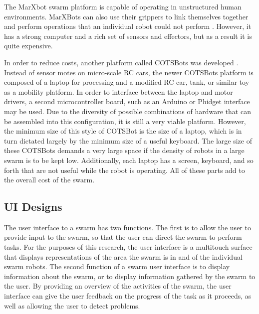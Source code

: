 \documentclass[]{article}
\begin{document}
The MarXbot swarm platform  is capable of operating in unstructured human environments. MarXBots can also use their grippers to link themselves together and perform operations  that an individual robot could not perform \cite{bonani2010marxbot}. However, it has a strong computer and a rich set of sensors and effectors, but as a result it is quite expensive. 

In order to reduce costs, another platform called COTSBots was developed \cite{soule2011cotsbots}.  
Instead of sensor motes on micro-scale RC cars, the newer COTSBots platform is composed of a laptop for processing and a modified RC car, tank, or similar toy as a mobility platform.
In order to interface between the laptop and motor drivers, a second microcontroller board, such as an Arduino or Phidget interface may be used. 
Due to the diversity of possible combinations of hardware that can be assembled into this configuration, it is still a very viable platform. 
However, the minimum size of this style of COTSBot is the size of a laptop, which is in turn dictated largely by the minimum size of a useful keyboard. 
The large size of these COTSBots demands a very large space if the density of robots in a large swarm is to be kept low. 
Additionally, each laptop has a screen, keyboard, and so forth that are not useful while the robot is operating. 
All of these parts add to the overall cost of the swarm. 


\subsection{UI Designs}

The user interface to a swarm has two functions. 
The first is to allow the user to provide input to the swarm, so that the user can direct the swarm to perform tasks. 
For the purposes of this research, the user interface is a multitouch surface  that displays representations of the area the swarm is in and of the individual swarm robots. 
The second function of a swarm user interface is to display information about the swarm, or to display information gathered by the swarm to the user. 
By providing an overview of the activities of the swarm, the user interface can give the user feedback on the progress of the task as it proceeds, as well as allowing the user to detect problems. 
\end{document}
